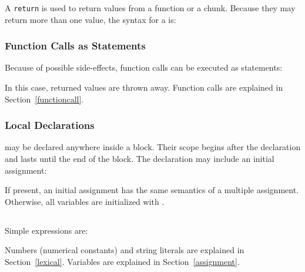 A {\tt return} is used to return values from a function or a chunk.
\label{return}
Because they may return more than one value,
the syntax for a  is:
\begin{Produc}
\end{Produc}

\subsubsection{Function Calls as Statements} \label{funcstat}
Because of possible side-effects,
function calls can be executed as statements:
\begin{Produc}
\end{Produc}%
In this case, returned values are thrown away.
Function calls are explained in Section~\ref{functioncall}.

\subsubsection{Local Declarations} \label{localvar}
 may be declared anywhere inside a block.
Their scope begins after the declaration and lasts until the
end of the block.
The declaration may include an initial assignment:
\begin{Produc}
\end{Produc}%
If present, an initial assignment has the same semantics
of a multiple assignment.
Otherwise, all variables are initialized with \nil.


\subsection{}

\subsubsection{}
Simple expressions are:
\begin{Produc}
\end{Produc}%
Numbers (numerical constants) and
string literals are explained in Section~\ref{lexical}.
Variables are explained in Section~\ref{assignment}.

